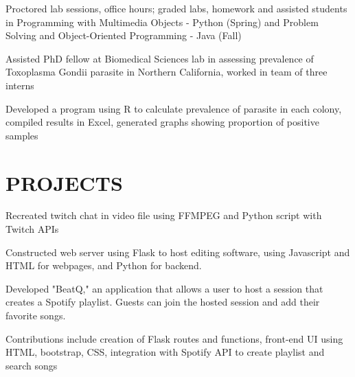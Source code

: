 \documentclass[]{deedy-resume-openfont}
\begin{document}
\begin{minipage}[t]{0.67\textwidth}
\begin{tightemize}
\item Proctored lab sessions, office hours; graded labs, homework and assisted students in Programming with Multimedia Objects - Python (Spring) and Problem Solving and Object-Oriented Programming - Java (Fall)
\end{tightemize}
\sectionsep

\begin{tightemize}
\item Assisted PhD fellow at Biomedical Sciences lab in assessing prevalence of Toxoplasma Gondii parasite in Northern California, worked in team of three interns
\item Developed a program using R to calculate prevalence of parasite in each colony, compiled results in Excel, generated graphs showing proportion of positive samples
\end{tightemize}
\sectionsep


\section {PROJECTS}

\begin{tightemize}
\item Recreated twitch chat in video file using FFMPEG and Python script with Twitch APIs
\item Constructed web server using Flask to host editing software, using Javascript and HTML for webpages, and Python for backend.
\end{tightemize}
\sectionsep

\begin{tightemize}
\item Developed "BeatQ," an application that allows a user to host a session that  creates a Spotify playlist. Guests can join the hosted session and add their favorite songs.
\item Contributions include creation of Flask routes and functions, front-end UI using HTML, bootstrap, CSS, integration with Spotify API to create playlist and search songs
\end{tightemize}
\sectionsep


\end{minipage}
\end{document}
